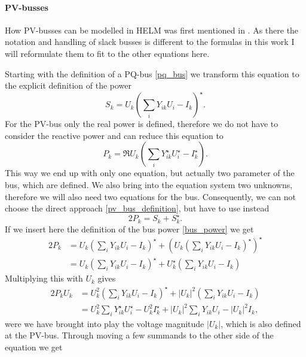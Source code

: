 \paragraph{PV-busses}

How PV-busses can be modelled in HELM was first mentioned in \citep{helmPV}. As there the notation and handling of slack busses is different to the formulas in this work I will reformulate them to fit to the other equations here.

Starting with the definition of a PQ-bus \eqref{pq_bus} we transform this equation to the explicit definition of the power
\begin{equation}
	S_k = U_k \left( \sum_i Y_{ik} U_i - I_k \right)^\star.
	\label{eq:bus_power}
\end{equation}
For the PV-bus only the real power is defined, therefore we do not have to consider the reactive power and can reduce this equation to
\begin{equation}
	P_k = \Re{U_k \left( \sum_i Y_{ik}^\star U_i^\star - I_k^\star \right)}.
	\label{eq:pv_bus_definition}
\end{equation}
This way we end up with only one equation, but actually two parameter of the bus, which are defined. We also bring into the equation system two unknowns, therefore we will also need two equations for the bus. Consequently, we can not choose the direct approach \eqref{pv_bus_definition}, but have to use instead
\begin{equation}
	2 P_k = S_k + S_k^\star.
\end{equation}
If we insert here the definition of the bus power \eqref{bus_power} we get
\begin{align}
	2 P_k 	& = U_k \left( \sum_i Y_{ik} U_i - I_k \right)^\star + \left( U_k \left( \sum_i Y_{ik} U_i - I_k \right)^\star \right)^\star \\
			& = U_k \left( \sum_i Y_{ik} U_i - I_k \right)^\star + U_k^\star \left( \sum_i Y_{ik} U_i - I_k \right)
\end{align}
Multiplying this with $U_k$ gives
\begin{align}
	2 P_k U_k 	& = U_k^2 \left( \sum_i Y_{ik} U_i - I_k \right)^\star + |U_k|^2 \left( \sum_i Y_{ik} U_i - I_k \right) \\
				& = U_k^2 \sum_i Y_{ik}^\star U_i^\star - U_k^2 I_k^\star + |U_k|^2 \sum_i Y_{ik} U_i - |U_k|^2 I_k,
\end{align}
were we have brought into play the voltage magnitude $|U_k|$, which is also defined at the PV-bus. Through moving a few summands to the other side of the equation we get
